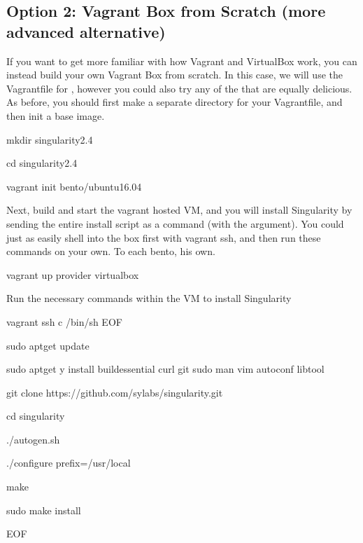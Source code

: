 \documentclass[letterpaper,10pt,english]{sphinxmanual}
\begin{document}
\subsection{Option 2: Vagrant Box from Scratch (more advanced alternative)}
\label{\detokenize{installation:option-2-vagrant-box-from-scratch-more-advanced-alternative}}
If you want to get more familiar with how Vagrant and VirtualBox work, you can instead build your own Vagrant Box from scratch. In this case, we will use the Vagrantfile for , however you could also try any of the  that are equally delicious. As before, you should first make a separate directory for your Vagrantfile, and then init a base image.

%
\begin{sphinxVerbatim}[commandchars=\\\{\}]
mkdir singularity\PYGZhy{}2.4

cd singularity\PYGZhy{}2.4

vagrant init bento/ubuntu\PYGZhy{}16.04
\end{sphinxVerbatim}

Next, build and start the vagrant hosted VM, and you will install Singularity by sending the entire install script as a command (with the  argument). You could just as easily shell into the box first with vagrant ssh, and then run these commands on your own. To each bento, his own.

%
\begin{sphinxVerbatim}[commandchars=\\\{\}]
vagrant up \PYGZhy{}\PYGZhy{}provider virtualbox


\PYGZsh{} Run the necessary commands within the VM to install Singularity

vagrant ssh \PYGZhy{}c /bin/sh \PYGZlt{}\PYGZlt{}EOF

    sudo apt\PYGZhy{}get update

    sudo apt\PYGZhy{}get \PYGZhy{}y install build\PYGZhy{}essential curl git sudo man vim autoconf libtool

    git clone https://github.com/sylabs/singularity.git

    cd singularity

    ./autogen.sh

    ./configure \PYGZhy{}\PYGZhy{}prefix=/usr/local

    make

    sudo make install

EOF
\end{sphinxVerbatim}
\end{document}
